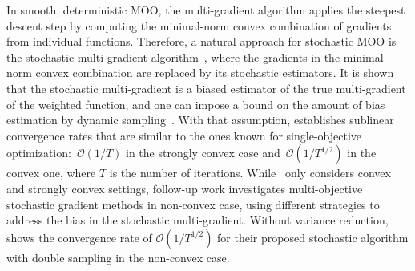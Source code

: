 \documentclass[11pt,a4paper]{article}
\numberwithin{equation}{section}%
\renewcommand{\(}{\left (}
\renewcommand{\)}{\right )}
\begin{document}
In smooth, deterministic MOO, the multi-gradient algorithm applies the steepest descent step by computing the minimal-norm convex combination of gradients from individual functions. Therefore, a natural approach for stochastic MOO is the stochastic multi-gradient algorithm~\cite{MQuentin_PFabrice_JADesideri_2018,SLiu_LNVicente_2019}, where the gradients in the minimal-norm convex combination are replaced by its stochastic estimators. It is shown that the stochastic multi-gradient is a biased estimator of the true multi-gradient of the weighted function, and one can impose a bound on the amount of bias estimation by dynamic sampling~\cite{SLiu_LNVicente_2019}. With that assumption, 
\cite{SLiu_LNVicente_2019} establishes sublinear convergence rates that are similar to the ones known for single-objective optimization:~$\mathcal{O}(1/T)$ in the strongly convex case and~$\mathcal{O}(1/T^{1/2})$ in the convex one, where $T$ is the number of iterations.
While~\cite{SLiu_LNVicente_2019} only considers convex and strongly convex settings, follow-up work
\cite{SZhou_etal_2022,HFernando_etal_2023,LChen_HFernando_YYing_TChen_2023,HFernando_etal_2024} investigates multi-objective stochastic gradient methods in non-convex case, using different strategies to address the bias in the stochastic multi-gradient.
Without variance reduction,~\cite{LChen_HFernando_YYing_TChen_2023} shows the convergence rate of $\mathcal{O}(1/T^{1/2})$ for their proposed stochastic algorithm with double sampling in the non-convex case. 

 
\end{document}
